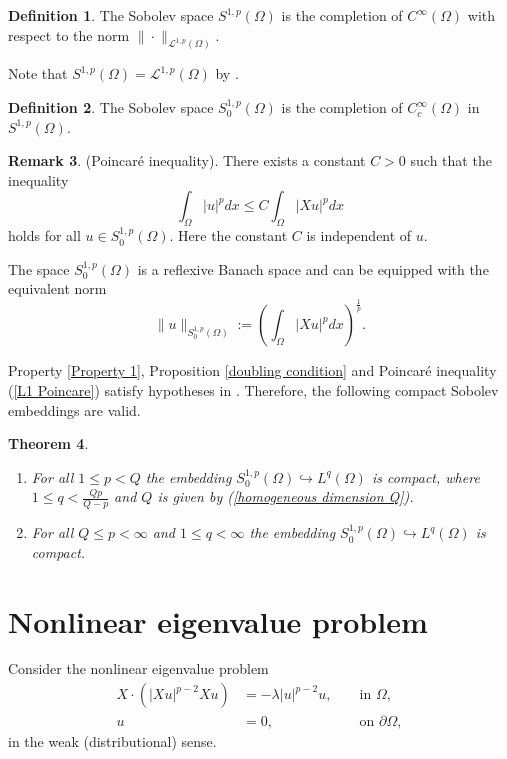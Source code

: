 \documentclass[a4paper,12pt,reqno]{amsart}
\renewcommand\eqref[1]{(\ref{#1})} %
\numberwithin{equation}{section}
\theoremstyle{plain}
\newtheorem{thm}{Theorem}[section]
\theoremstyle{definition}
\newtheorem{defn}[thm]{Definition}
\newtheorem{rem}[thm]{Remark}
\begin{document}
\begin{defn}
The Sobolev space $S^{1,p}(\Omega)$ is the completion of $C^{\infty}(\Omega)$ with respect to the norm $\|\cdot\|_{\mathscr{L}^{1,p}(\Omega)}$.
\end{defn}
Note that $S^{1,p}(\Omega)=\mathscr{L}^{1, p}(\Omega)$ by \cite[Theorem 1.13]{GN1996}.
\begin{defn}
The Sobolev space $S_{0}^{1,p}(\Omega)$ is the completion of $C_{c}^{\infty}(\Omega)$ in $S^{1,p}(\Omega)$.
\end{defn}
\begin{rem}(Poincar\'e inequality). There exists a  constant $C>0$ such that the inequality
\begin{equation}\label{Poincare inequality}
\int_{\Omega}|u|^{p} d x\leq C \int_{\Omega}|X u|^{p} d x
\end{equation}
holds for all $u\in S_{0}^{1,p}(\Omega)$. Here the constant $C$ is independent of $u$.
\end{rem}

The space $S_{0}^{1,p}(\Omega)$ is a reflexive Banach space and can be equipped with the equivalent norm
\begin{equation}\label{Poincare norm}
\|u\|_{S_{0}^{1,p}(\Omega)}:=\left(\int_{\Omega}\left|X u\right|^{p} d x\right)^{\frac{1}{p}}.
\end{equation}

Property \ref{Property 1}, Proposition \ref{doubling condition} and Poincar\'e inequality \eqref{L1 Poincare}  satisfy hypotheses  in \cite[pp. 1084-1085]{GN1996}.
Therefore, the following compact Sobolev embeddings are valid.
\begin{thm}\label{compact Sobolev embedding}\cite[Theorem 1.28]{GN1996}
\begin{enumerate}
    \item For all $1\leq p <Q$ the embedding $S^{1,p}_{0}(\Omega)\hookrightarrow L^{q}(\Omega)$ is compact, where $1\leq q < \frac{Qp}{Q-p}$ and $Q$ is given by \eqref{homogeneous dimension Q}.  
    \item For all $Q\leq p  <\infty$ and $1\leq q <\infty$ the embedding $S^{1,p}_{0}(\Omega)\hookrightarrow L^{q}(\Omega)$ is compact.
\end{enumerate}\end{thm}

\section{Nonlinear eigenvalue problem}\label{sec3}
Consider the nonlinear eigenvalue problem
\begin{equation}\label{eigenvalue problem}
\begin{aligned}
X \cdot\left(\left|X u\right|^{p-2} X u\right)&=-\lambda|u|^{p-2} u,  &&\text { in } \Omega, \\
u&=0,
&&\text { on } \partial \Omega,
\end{aligned}
\end{equation}
in the weak (distributional) sense.
\end{document}
